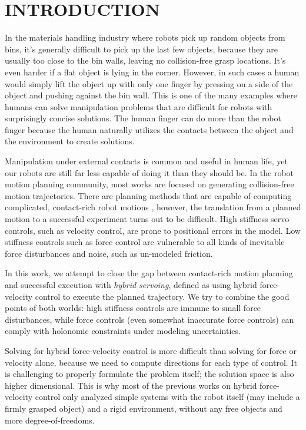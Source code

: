 
\section{INTRODUCTION}
\label{sec:intro}

In the materials handling industry where robots pick up random objects from bins, it's generally difficult to pick up the last few objects, because they are usually too close to the bin walls, leaving no collision-free grasp locations. It's even harder if a flat object is lying in the corner. However, in such cases a human would simply lift the object up with only one finger by pressing on a side of the object and pushing against the bin wall.
This is one of the many examples where humans can solve manipulation problems that are difficult for robots with surprisingly concise solutions. The human finger can do more than the robot finger because the human naturally utilizes the contacts between the object and the environment to create solutions.

Manipulation under external contacts is common and useful in human life, yet our robots are still far less capable of doing it than they should be.
In the robot motion planning community, most works are focused on generating collision-free motion trajectories.
There are planning methods that are capable of computing complicated, contact-rich robot motions \cite{mordatch2012discovery,posa2014direct}, however, the translation from a planned motion to a successful experiment turns out to be difficult. High stiffness servo controls, such as velocity control, are prone to positional errors in the model. Low stiffness controls such as force control are vulnerable to all kinds of inevitable force disturbances and noise, such as un-modeled friction.

In this work, we attempt to close the gap between contact-rich motion planning and successful execution with \textit{hybrid servoing}, defined as using hybrid force-velocity control to execute the planned trajectory. We try to combine the good points of both worlds: high stiffness controls are immune to small force disturbances, while force controls (even somewhat inaccurate force controls) can comply with holonomic constraints under modeling uncertainties.

Solving for hybrid force-velocity control is more difficult than solving for force or velocity alone, because we need to compute directions for each type of control. It is challenging to properly formulate the problem itself; the solution space is also higher dimensional. This is why most of the previous works on hybrid force-velocity control only analyzed simple systems with the robot itself (may include a firmly grasped object) and a rigid environment, without any free objects and more degree-of-freedoms.

